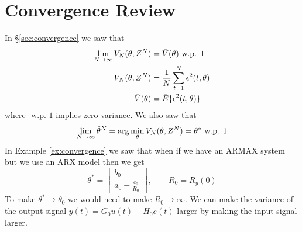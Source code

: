 
\mainmatter
\setcounter{page}{1}

\lectureseries[\course]{\course}

\date{November 12, 2009}

\setaddress

\setcounter{lecture}{13}
\setcounter{chapter}{13}


\section{Convergence Review}
In \S\ref{sec:convergence} we saw that
\begin{align*}
\lim_{N\to\infty}V_N(\theta,Z^N) &= \bar{V}(\theta) \text{ w.p. } 1 \\
V_N(\theta,Z^N) &= \frac{1}{N}\sum_{t=1}^N\epsilon^2(t,\theta) \\
\bar{V}(\theta) &= \bar{E}\{\epsilon^2(t,\theta)\}
\end{align*}
where $\text{ w.p. } 1$ implies zero variance. We also saw that
$$\lim_{N\to\infty}\hat{\theta}^N = \arg\min_\theta V_N(\theta,Z^N) = \theta^\ast \text{ w.p. } 1$$
In Example \ref{ex:convergence} we saw that when if we have an ARMAX system but we use an ARX model then we get
$$\theta^\ast = \left[\begin{array}{c} b_0 \\ a_0-\frac{c_0}{R_0} \end{array}\right], \qquad R_0=R_y(0)$$
To make $\theta^\ast\to\theta_0$ we would need to make $R_0\to\infty$. We can make the variance of the output signal $y(t)=G_0u(t)+H_0e(t)$ larger by making the input signal larger.

